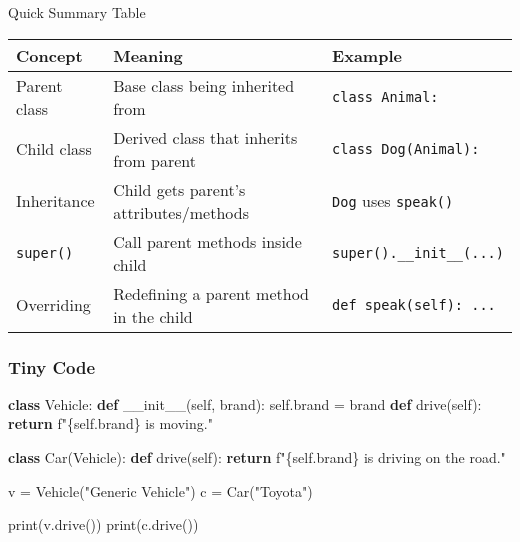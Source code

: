 \documentclass[
  letterpaper,
  DIV=11,
  numbers=noendperiod]{scrreprt}
\newenvironment{Shaded}{\begin{snugshade}}{\end{snugshade}}
\newcommand{\BuiltInTok}[1]{\textcolor[rgb]{0.00,0.23,0.31}{#1}}
\newcommand{\ControlFlowTok}[1]{\textcolor[rgb]{0.00,0.23,0.31}{\textbf{#1}}}
\newcommand{\FunctionTok}[1]{\textcolor[rgb]{0.28,0.35,0.67}{#1}}
\newcommand{\KeywordTok}[1]{\textcolor[rgb]{0.00,0.23,0.31}{\textbf{#1}}}
\newcommand{\NormalTok}[1]{\textcolor[rgb]{0.00,0.23,0.31}{#1}}
\newcommand{\OperatorTok}[1]{\textcolor[rgb]{0.37,0.37,0.37}{#1}}
\newcommand{\SpecialCharTok}[1]{\textcolor[rgb]{0.37,0.37,0.37}{#1}}
\newcommand{\SpecialStringTok}[1]{\textcolor[rgb]{0.13,0.47,0.30}{#1}}
\newcommand{\StringTok}[1]{\textcolor[rgb]{0.13,0.47,0.30}{#1}}
\newcommand{\VariableTok}[1]{\textcolor[rgb]{0.07,0.07,0.07}{#1}}
\begin{document}
Quick Summary Table

\begin{longtable}[]{@{}
  >{\raggedright\arraybackslash}p{}
  >{\raggedright\arraybackslash}p{}
  >{\raggedright\arraybackslash}p{}@{}}
\toprule\noalign{}
\begin{minipage}[b]{\linewidth}\raggedright
Concept
\end{minipage} & \begin{minipage}[b]{\linewidth}\raggedright
Meaning
\end{minipage} & \begin{minipage}[b]{\linewidth}\raggedright
Example
\end{minipage} \\
\midrule\noalign{}
\endhead
\bottomrule\noalign{}
\endlastfoot
Parent class & Base class being inherited from &
\texttt{class\ Animal:} \\
Child class & Derived class that inherits from parent &
\texttt{class\ Dog(Animal):} \\
Inheritance & Child gets parent's attributes/methods & \texttt{Dog} uses
\texttt{speak()} \\
\texttt{super()} & Call parent methods inside child &
\texttt{super().\_\_init\_\_(...)} \\
Overriding & Redefining a parent method in the child &
\texttt{def\ speak(self):\ ...} \\
\end{longtable}

\subsubsection{Tiny Code}\label{tiny-code-64}

\begin{Shaded}
\begin{Highlighting}[]
\KeywordTok{class}\NormalTok{ Vehicle:}
    \KeywordTok{def} \FunctionTok{\_\_init\_\_}\NormalTok{(}\VariableTok{self}\NormalTok{, brand):}
        \VariableTok{self}\NormalTok{.brand }\OperatorTok{=}\NormalTok{ brand}
    \KeywordTok{def}\NormalTok{ drive(}\VariableTok{self}\NormalTok{):}
        \ControlFlowTok{return} \SpecialStringTok{f"}\SpecialCharTok{\{}\VariableTok{self}\SpecialCharTok{.}\NormalTok{brand}\SpecialCharTok{\}}\SpecialStringTok{ is moving."}

\KeywordTok{class}\NormalTok{ Car(Vehicle):}
    \KeywordTok{def}\NormalTok{ drive(}\VariableTok{self}\NormalTok{):}
        \ControlFlowTok{return} \SpecialStringTok{f"}\SpecialCharTok{\{}\VariableTok{self}\SpecialCharTok{.}\NormalTok{brand}\SpecialCharTok{\}}\SpecialStringTok{ is driving on the road."}

\NormalTok{v }\OperatorTok{=}\NormalTok{ Vehicle(}\StringTok{"Generic Vehicle"}\NormalTok{)}
\NormalTok{c }\OperatorTok{=}\NormalTok{ Car(}\StringTok{"Toyota"}\NormalTok{)}

\BuiltInTok{print}\NormalTok{(v.drive())}
\BuiltInTok{print}\NormalTok{(c.drive())}
\end{Highlighting}
\end{Shaded}
\end{document}
